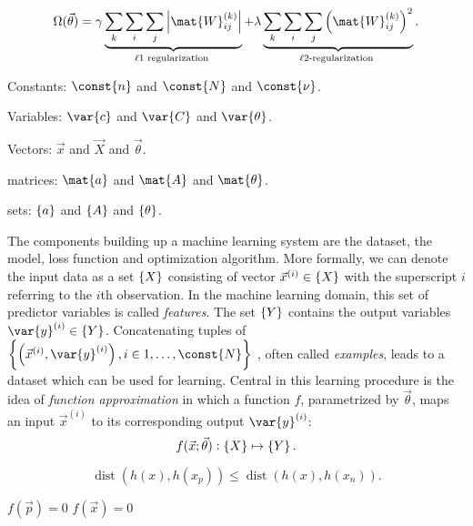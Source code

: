 \documentclass[\home/main.tex]{subfiles}
\begin{document}
\begin{equation} \label{eq:regularization-term}
    \Omega(\vec{\theta})=\gamma \underbrace{\sum_{k} \sum_{i} \sum_{j}\left|\mat{W}_{i j}^{(k)}\right|}_{\ell 1 \text { regularization }}+\lambda \underbrace{\sum_{k} \sum_{i} \sum_{j}\left(\mat{W}_{i j}^{(k)}\right)^{2}}_{\ell 2 \text {-regularization }}.
\end{equation}

Constants: $\const{n}$ and $\const{N}$ and $\const{\nu}$.

Variables: $\var{c}$ and $\var{C}$ and $\var{\theta}$.

Vectors: $\vec{x}$ and $\vec{X}$ and $\vec{\theta}$.

matrices: $\mat{a}$ and $\mat{A}$ and $\mat{\theta}$.

sets: $\set{a}$ and $\set{A}$ and $\set{\theta}$.


The components building up a machine learning system are the dataset, the model, loss function and optimization algorithm.
More formally, we can denote the input data as a set $\set{X}$ consisting of vector $\vec{x}^{(i)} \in \set{X} $ with the superscript $i$ referring to the $i$th observation. In the machine learning domain, this set of predictor variables is called \textit{features}. The set $\set{Y}$ contains the output variables $\var{y}^{(i)} \in \set{Y}$. Concatenating tuples of
$\left\{\left(\vec{x}^{(i)}, \var{y}^{(i)}\right) , i \in 1,\dots,\const{N} \right\}$
, often called \textit{examples}, leads to a dataset which can be used for learning. Central in this learning procedure is the idea of \textit{function approximation} in which a function $f$, parametrized by $\vec{\theta}$, maps an input $\vec{x}^{(i)}$ to its corresponding output $\var{y}^{(i)}$:
\begin{equation*}
    f(\vec{x};\vec{\theta}): \set{X} \mapsto \set{Y}\text{.}
\end{equation*}



\begin{equation*}
    \operatorname{dist}{\left( h(x),h(x_p) \right)} \leq \operatorname{dist}{\left( h(x),h(x_n) \right)} .
\end{equation*}


$f(\vec{p}) = 0$
$f(\vec{x}) = 0$
\end{document}
